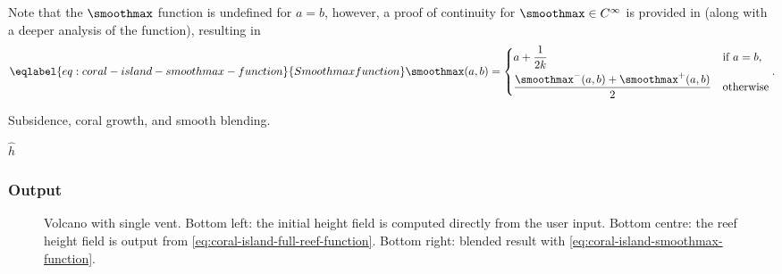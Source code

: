 Note that the $\smoothmax$ function is undefined for $a = b$, however, a proof of continuity for $\smoothmax \in C^\infty$ is provided in  (along with a deeper analysis of the function), resulting in
\begin{align}
    \eqlabel{eq:coral-island-smoothmax-function}{Smoothmax function}
    \smoothmax(a, b) = \begin{dcases}
        a + \frac{1}{2k} & \text{if } a = b, \\
        \frac{\smoothmax^-(a, b) + \smoothmax^+(a, b)}{2} & \text{otherwise}
    \end{dcases}.
\end{align}

\begin{algorithm}[H]
    \caption{Subsidence, coral growth, and smooth blending.}
    \label{alg:subsidence-coral-blend}
    \DontPrintSemicolon
    \BlankLine




    \Return $\hat{h}$
\end{algorithm}

\subsubsection{Output}
\label{sec:coral-island-procedural-output}

\begin{figure}
    \caption[Volcano with coral reef generated using our curve-based method]{Volcano with single vent. Bottom left: the initial height field is computed directly from the user input. Bottom centre: the reef height field is output from \cref{eq:coral-island-full-reef-function}. Bottom right: blended result with \cref{eq:coral-island-smoothmax-function}.}
    \label{fig:coral-island-volcano-example}
\end{figure}

